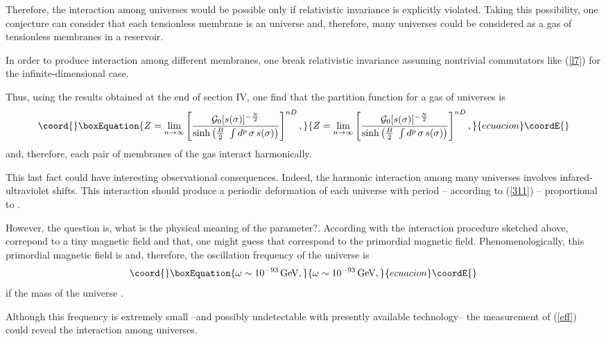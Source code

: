 \documentclass[a4paper,aps,twocolumn,amsfonts]{revtex4}
\begin{document}
   Therefore, the interaction among universes would be possible only if relativistic  invariance is explicitly violated. Taking this possibility, one conjecture can consider that each tensionless membrane is an universe and, therefore,  many universes could be considered as a gas of tensionless membranes in a reservoir.

   In order to produce interaction among different membranes, one break relativistic invariance assuming nontrivial commutators like 
   (\ref{l7})  for the infinite-dimensional case. 
   
   Thus, using the results obtained at the end of section IV, one find that the partition function for a gas of \coordHE{} universes is
   \begin{equation}\coord{}\boxEquation{
   Z=  \lim_{n \to \infty}  \left[\frac{{\cal G}_0[s (\sigma)]^{-\frac{N }{2}}}{\sinh\left(\frac{B}{2}~\int
   d^p\,\sigma\, s (\sigma)\right)}\right]^{nD},  \label{311}
   }{
   Z=  \lim_{n \to \infty}  \left[\frac{{\cal G}_0[s (\sigma)]^{-\frac{N }{2}}}{\sinh\left(\frac{B}{2}~\int
   d^p\,\sigma\, s (\sigma)\right)}\right]^{nD},  }{ecuacion}\coordE{}\end{equation}
   and, therefore, each pair of membranes of the gas  interact harmonically.

   This last fact could have interesting observational consequences.  Indeed, the harmonic interaction among many universes involves infared-ultraviolet shifts. This interaction should  produce a periodic deformation of each universe with period -- according to (\ref{311}) --  proportional to \coordHE{}.  
   
   However, the question is, what is the physical meaning of the \coordHE{} parameter?. According with the interaction procedure sketched above, \coordHE{} correpond   to a tiny magnetic field and that, one might guess  that correspond to the primordial magnetic field. Phenomenologically, this primordial magnetic field is  \coordHE{} and, therefore, the oscillation frequency of the universe is 
   \begin{equation}\coord{}\boxEquation{
   \omega \sim 10^{-93} \, \mbox{GeV}, \label{eff}
   }{
   \omega \sim 10^{-93} \, \mbox{GeV}, }{ecuacion}\coordE{}\end{equation}
   if the mass of the universe \coordHE{}. 

   Although this frequency  is extremely small --and possibly undetectable with presently available technology-- the measurement of (\ref{eff}) could reveal the interaction among universes. 
\end{document}

